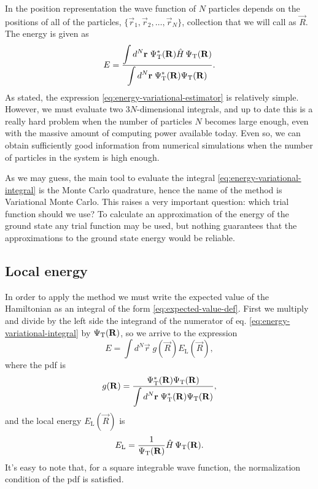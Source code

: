 In the position representation the wave function of $N$ particles depends on the
positions of all of the particles, $\{ \vec r_1, \vec r_2, \ldots, \vec r_N \}$,
collection that we will call as $\vec R$. The energy is given as
%
\begin{equation}
	\label{eq:energy-variational-integral}
	E = \frac{\displaystyle \int d^N \mathbf r \; \Psi_{\mathrm{T}}^{*}(\mathbf R) \hat H \, \Psi_{\mathrm{T}}(\mathbf R)}{
		\displaystyle \int d^N \mathbf r \; \Psi_{\mathrm{T}}^{*}(\mathbf R) \Psi_{\mathrm{T}}(\mathbf R)}.
\end{equation}
%
As stated, the expression \eqref{eq:energy-variational-estimator} is relatively
simple. However, we must evaluate two $3N$-dimensional integrals, and up to date
this is a really hard problem when the number of particles $N$ becomes large
enough, even with the massive amount of computing power available today. Even
so, we can obtain sufficiently good information from numerical simulations when
the number of particles in the system is high enough.

As we may guess, the main tool to evaluate the integral
\eqref{eq:energy-variational-integral} is the Monte Carlo quadrature, hence the
name of the method is Variational Monte Carlo. This raises a very important
question: which trial function should we use? To calculate an approximation of
the energy of the ground state any trial function may be used, but nothing
guarantees that the approximations to the ground state energy would be reliable.


\subsection{Local energy}

In order to apply the {\VMC} method we must write the expected value of the
Hamiltonian as an integral of the form \eqref{eq:expected-value-def}. First we
multiply and divide by the left side the integrand of the numerator of eq.
\eqref{eq:energy-variational-integral} by $\Psi_{\mathrm{T}}(\mathbf R)$, so  we arrive to the
expression
%
\begin{equation}
	E = \int d^N \vec r \; g(\vec R) E_{\mathrm{L}}(\vec R),
\end{equation}
%
where the pdf is
%
\begin{equation}
	g(\mathbf R) = \frac{\Psi_{\mathrm{T}}^{*}(\mathbf R) \Psi_{\mathrm{T}}(\mathbf R)}{\displaystyle \int d^N \mathbf r \; \Psi_{\mathrm{T}}^{*}(\mathbf R) \Psi_{\mathrm{T}}(\mathbf R)},
\end{equation}
%
and the local energy $E_\mathrm{L}(\vec R)$ is
%
\begin{equation}
	\label{eq:local-energy-definition}
	E_{\mathrm{L}} = \frac{1}{\Psi_{\mathrm{T}}(\mathbf R)} \hat H \, \Psi_{\mathrm{T}}(\mathbf R).
\end{equation}
%
It's easy to note that, for a square integrable wave function, the normalization
condition of the pdf is satisfied.

